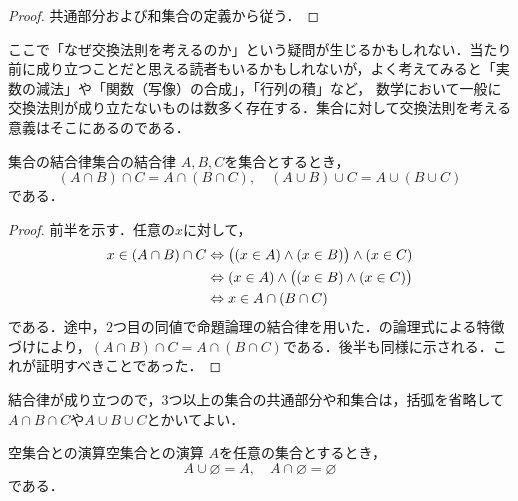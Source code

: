\begin{tleftbar}
  \begin{proof}
    共通部分および和集合の定義から従う．
  \end{proof}
\end{tleftbar}

\begin{remark}[交換法則を考える意義]
  ここで「なぜ交換法則を考えるのか」という疑問が生じるかもしれない．当たり前に成り立つことだと思える読者もいるかもしれないが，よく考えてみると「実数の減法」や「関数（写像）の合成」，「行列の積」など，
  数学において一般に交換法則が成り立たないものは数多く存在する．集合に対して交換法則を考える意義はそこにあるのである．
\end{remark}

\begin{prop}{集合の結合律}{集合の結合律}
  $A,B,C$を集合とするとき，
  \[
    (A \cap B) \cap C = A \cap (B \cap C), \quad (A \cup B) \cup C = A \cup (B \cup C)
  \]
  である．
\end{prop}

\begin{tleftbar}
  \begin{proof}
    前半を示す．任意の$x$に対して，
    \begin{align*}
      x \in (A \cap B) \cap C
      & \mathrel{\Leftrightarrow} \bigl( (x \in A) \land (x \in B) \bigr) \land (x \in C) \\
      & \mathrel{\Leftrightarrow} (x \in A) \land \bigl( (x \in B) \land (x \in C) \bigr) \\
      & \mathrel{\Leftrightarrow} x \in A \cap (B \cap C)
    \end{align*}
    である．途中，$2$つ目の同値で命題論理の結合律を用いた．の論理式による特徴づけにより，$(A \cap B) \cap C = A \cap (B \cap C)$である．後半も同様に示される．これが証明すべきことであった．
  \end{proof}
\end{tleftbar}

結合律が成り立つので，$3$つ以上の集合の共通部分や和集合は，括弧を省略して$A \cap B \cap C$や$A \cup B \cup C$とかいてよい．

\begin{prop}{空集合との演算}{空集合との演算}
  $A$を任意の集合とするとき，
  \[
    A \cup \varnothing = A, \quad A \cap \varnothing = \varnothing
  \]
  である．
\end{prop}

